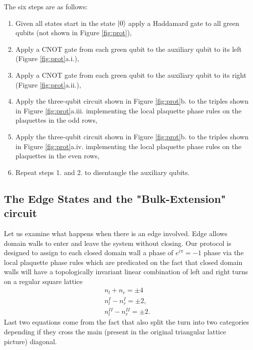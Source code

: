 \documentclass[a4paper,twocolumn,11pt]{quantumarticle}
\begin{document}
The six steps are as follows:\begin{enumerate}
\item Given all states start in the state $\ket{0}$ apply a Haddamard gate to all green qubits (not shown in Figure \ref{fig:prot}),
\item Apply a CNOT gate from each green qubit to the auxiliary qubit to its left (Figure \ref{fig:prot}a.i.),
\item Apply a CNOT gate from each green qubit to the auxiliary qubit to its right (Figure \ref{fig:prot}a.ii.),
\item Apply the three-qubit circuit shown in Figure \ref{fig:prot}b. to the triples shown in Figure \ref{fig:prot}a.iii. implementing the local plaquette phase rules on the plaquettes in the odd rows,
\item Apply the three-qubit circuit shown in Figure \ref{fig:prot}b. to the triples shown in Figure \ref{fig:prot}a.iv. implementing the local plaquette phase rules on the plaquettes in the even rows,
\item Repeat steps 1. and 2. to disentangle the auxiliary qubits.
\end{enumerate}


\subsection{The Edge States and the "Bulk-Extension" circuit}

Let us examine what happens when there is an edge involved. 
Edge allows domain walls to enter and leave the system without closing.
Our protocol is designed to assign to each closed domain wall a phase of $e^{i\pi} = -1$ phase via the local plaquette phase rules which are predicated on the fact that closed domain walls will have a topologically invariant linear combination of left and right turns on a regular square lattice \begin{gather}
n_l  + n_r = \pm 4\\
n_l^{I} - n_r^{I} = \pm 2,\\
n_l^{II} - n_r^{II} = \pm 2.
\end{gather}
Last two equations come from the fact that also split the turn into two categories depending if they cross the main (present in the original triangular lattice picture) diagonal.  
\end{document}
